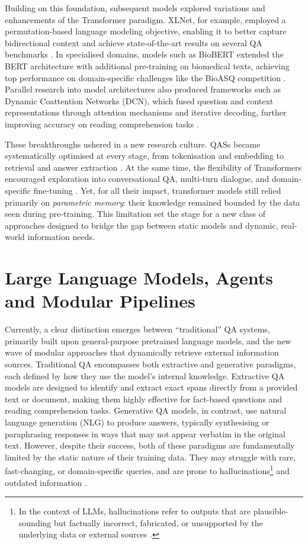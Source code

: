 \begin{spacing}{1.5}
Building on this foundation, subsequent models explored variations and enhancements of the Transformer paradigm. XLNet, for example, employed a permutation-based language modeling objective, enabling it to better capture bidirectional context and achieve state-of-the-art results on several QA benchmarks \citep{yang_xlnet_2020}. In specialised domains, models such as BioBERT extended the BERT architecture with additional pre-training on biomedical texts, achieving top performance on domain-specific challenges like the BioASQ competition \citep{yoon_pre-trained_2019}. Parallel research into model architectures also produced frameworks such as Dynamic Coattention Networks (DCN), which fused question and context representations through attention mechanisms and iterative decoding, further improving accuracy on reading comprehension tasks \citep{xiong_dynamic_2018}.

These breakthroughs ushered in a new research culture. QASs became systematically optimised at every stage, from tokenisation and embedding to retrieval and answer extraction \citep{farea_understanding_2025}. At the same time, the flexibility of Transformers encouraged exploration into conversational QA, multi-turn dialogue, and domain-specific fine-tuning \citep{yue_survey_2025}. Yet, for all their impact, transformer models still relied primarily on \textit{parametric memory}: their knowledge remained bounded by the data seen during pre-training. This limitation set the stage for a new class of approaches designed to bridge the gap between static models and dynamic, real-world information needs.

\section{Large Language Models, Agents and Modular Pipelines}\label{sec:llm-agents}
Currently, a clear distinction emerges between ``traditional'' QA systems, primarily built upon general-purpose pretrained language models, and the new wave of modular approaches that dynamically retrieve external information sources. Traditional QA encompasses both extractive and generative paradigms, each defined by how they use the model’s internal knowledge. Extractive QA models are designed to identify and extract exact spans directly from a provided text or document, making them highly effective for fact-based questions and reading comprehension tasks. Generative QA models, in contrast, use natural language generation (NLG) to produce answers, typically synthesising or paraphrasing responses in ways that may not appear verbatim in the original text. However, despite their success, both of these paradigms are fundamentally limited by the static nature of their training data. They may struggle with rare, fast-changing, or domain-specific queries, and are prone to hallucinations\footnote{In the context of LLMs, hallucinations refer to outputs that are plausible-sounding but factually incorrect, fabricated, or unsupported by the underlying data or external sources \citep{harsh_comprehending_2024}.} and outdated information \citep{farea_understanding_2025}.


\end{spacing}

